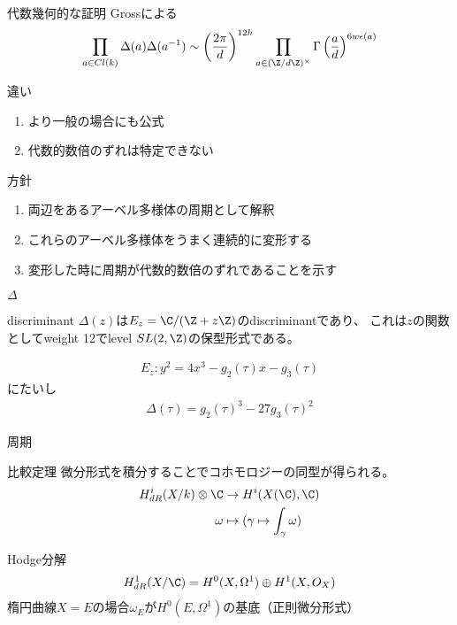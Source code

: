 \documentclass[dvipdfmx,aspectratio=169]{beamer}
\begin{document}
\begin{frame}{代数幾何的な証明}
Grossによる
\begin{align*}
\prod_{a\in Cl(k)}\Delta(a)\Delta(a^{-1})\sim\left(\frac{2\pi}{d}\right)^{12h}\prod_{a\in(\Z/d\Z)^\times}\Gamma\left(\frac{a}{d}\right)^{6w\epsilon(a)}
\end{align*}

\begin{block}{違い}
\begin{enumerate}
\item より一般の場合にも公式
\item 代数的数倍のずれは特定できない
\end{enumerate}
\end{block}

\begin{block}{方針}
\begin{enumerate}
\item 両辺をあるアーベル多様体の周期として解釈
\item これらのアーベル多様体をうまく連続的に変形する
\item 変形した時に周期が代数的数倍のずれであることを示す
\end{enumerate}
\end{block}
\end{frame}

\begin{frame}{$\Delta$}
\begin{block}{discriminant}
$\Delta(z)$は$E_z=\C/(\Z + z\Z)$のdiscriminantであり、
これは$z$の関数としてweight 12でlevel $SL(2,\Z)$の保型形式である。
\end{block}

\begin{align*}
E_z:y^2=4x^3-g_2(\tau)x-g_3(\tau)
\end{align*}
にたいし
\begin{align*}
\Delta(\tau)=g_2(\tau)^3-27g_3(\tau)^2
\end{align*}

\end{frame}

\begin{frame}{周期}
\begin{block}{比較定理}
微分形式を積分することでコホモロジーの同型が得られる。
\begin{align*}
H^i_{dR}(X/k) \otimes \C &\to H^i(X(\C), \C)\\
\omega &\mapsto (\gamma\mapsto\int_\gamma\omega)
\end{align*}
\end{block}

\begin{block}{Hodge分解}
\begin{align*}
H^1_{dR}(X/\C)=H^0(X,\Omega^1)\oplus H^1(X,O_X)
\end{align*}
楕円曲線$X=E$の場合$\omega_E$が$H^0(E,\Omega^1)$の基底（正則微分形式）
\end{block}
\end{frame}
\end{document}
